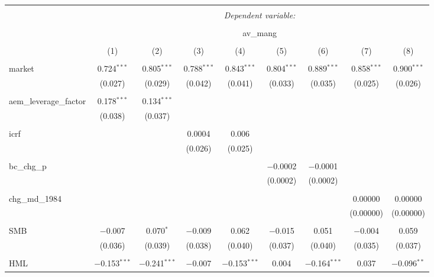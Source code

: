 
\begin{table}[!htbp] \centering 
  \caption{} 
  \label{} 
\begin{tabular}{@{\extracolsep{5pt}}lcccccccc} 
\\[-1.8ex]\hline 
\hline \\[-1.8ex] 
 & \multicolumn{8}{c}{\textit{Dependent variable:}} \\ 
\cline{2-9} 
\\[-1.8ex] & \multicolumn{8}{c}{av\_mang} \\ 
\\[-1.8ex] & (1) & (2) & (3) & (4) & (5) & (6) & (7) & (8)\\ 
\hline \\[-1.8ex] 
 market & 0.724$^{***}$ & 0.805$^{***}$ & 0.788$^{***}$ & 0.843$^{***}$ & 0.804$^{***}$ & 0.889$^{***}$ & 0.858$^{***}$ & 0.900$^{***}$ \\ 
  & (0.027) & (0.029) & (0.042) & (0.041) & (0.033) & (0.035) & (0.025) & (0.026) \\ 
  & & & & & & & & \\ 
 aem\_leverage\_factor & 0.178$^{***}$ & 0.134$^{***}$ &  &  &  &  &  &  \\ 
  & (0.038) & (0.037) &  &  &  &  &  &  \\ 
  & & & & & & & & \\ 
 icrf &  &  & 0.0004 & 0.006 &  &  &  &  \\ 
  &  &  & (0.026) & (0.025) &  &  &  &  \\ 
  & & & & & & & & \\ 
 bc\_chg\_p &  &  &  &  & $-$0.0002 & $-$0.0001 &  &  \\ 
  &  &  &  &  & (0.0002) & (0.0002) &  &  \\ 
  & & & & & & & & \\ 
 chg\_md\_1984 &  &  &  &  &  &  & 0.00000 & 0.00000 \\ 
  &  &  &  &  &  &  & (0.00000) & (0.00000) \\ 
  & & & & & & & & \\ 
 SMB & $-$0.007 & 0.070$^{*}$ & $-$0.009 & 0.062 & $-$0.015 & 0.051 & $-$0.004 & 0.059 \\ 
  & (0.036) & (0.039) & (0.038) & (0.040) & (0.037) & (0.040) & (0.035) & (0.037) \\ 
  & & & & & & & & \\ 
 HML & $-$0.153$^{***}$ & $-$0.241$^{***}$ & $-$0.007 & $-$0.153$^{***}$ & 0.004 & $-$0.164$^{***}$ & 0.037 & $-$0.096$^{**}$ \\ 

\end{tabular}
\end{table}
